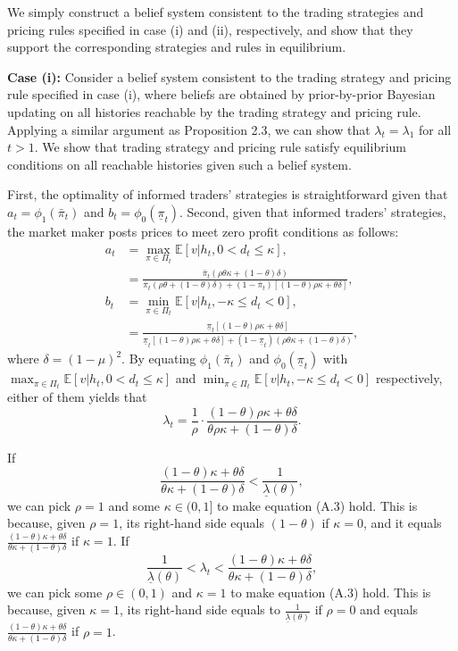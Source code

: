 \documentclass[12pt,a4paper]{article}
\newenvironment{original}{%
  \par\vspace{4pt}\noindent%
  \color{black}%
  \ignorespaces
}{%
  \par\vspace{2pt}%
}
\begin{document}
\begin{original}
We simply construct a belief system consistent to the trading strategies and pricing rules specified in case (i) and (ii), respectively, and show that they support the corresponding strategies and rules in equilibrium.

\textbf{Case (i):} Consider a belief system consistent to the trading strategy and pricing rule specified in case (i), where beliefs are obtained by prior-by-prior Bayesian updating on all histories reachable by the trading strategy and pricing rule. Applying a similar argument as Proposition 2.3, we can show that $\lambda_t = \lambda_1$ for all $t > 1$. We show that trading strategy and pricing rule satisfy equilibrium conditions on all reachable histories given such a belief system.

First, the optimality of informed traders' strategies is straightforward given that $a_t = \phi_1(\bar{\pi}_t)$ and $b_t = \phi_0(\underline{\pi}_t)$. Second, given that informed traders' strategies, the market maker posts prices to meet zero profit conditions as follows:
\begin{align*}
a_t &= \max_{\pi\in\Pi_t} \mathbb{E}[v|h_t, 0 < d_t \leq \kappa], \\
&= \frac{\bar{\pi}_t(\rho\theta\kappa + (1-\theta)\delta)}{\bar{\pi}_t(\rho\theta + (1-\theta)\delta) + (1-\bar{\pi}_t)[(1-\theta)\rho\kappa + \theta\delta]}, \\
b_t &= \min_{\pi\in\Pi_t} \mathbb{E}[v|h_t, -\kappa \leq d_t < 0], \\
&= \frac{\underline{\pi}_t[(1-\theta)\rho\kappa + \theta\delta]}{\underline{\pi}_t[(1-\theta)\rho\kappa + \theta\delta] + (1-\underline{\pi}_t)(\rho\theta\kappa + (1-\theta)\delta)},
\end{align*}
where $\delta = (1-\mu)^2$. By equating $\phi_1(\bar{\pi}_t)$ and $\phi_0(\underline{\pi}_t)$ with $\max_{\pi\in\Pi_t} \mathbb{E}[v|h_t, 0 < d_t \leq \kappa]$ and $\min_{\pi\in\Pi_t} \mathbb{E}[v|h_t, -\kappa \leq d_t < 0]$ respectively, either of them yields that
\[
\lambda_t = \frac{1}{\rho} \cdot \frac{(1-\theta)\rho\kappa + \theta\delta}{\theta\rho\kappa + (1-\theta)\delta}. \tag{A.3}
\]

If
\[
\frac{(1-\theta)\kappa + \theta\delta}{\theta\kappa + (1-\theta)\delta} < \frac{1}{\underline{\lambda}(\theta)},
\]
we can pick $\rho = 1$ and some $\kappa \in (0, 1]$ to make equation (A.3) hold. This is because, given $\rho = 1$, its right-hand side equals $(1-\theta)$ if $\kappa = 0$, and it equals $\frac{(1-\theta)\kappa + \theta\delta}{\theta\kappa + (1-\theta)\delta}$ if $\kappa = 1$. If
\[
\frac{1}{\underline{\lambda}(\theta)} < \lambda_t < \frac{(1-\theta)\kappa + \theta\delta}{\theta\kappa + (1-\theta)\delta},
\]
we can pick some $\rho \in (0, 1)$ and $\kappa = 1$ to make equation (A.3) hold. This is because, given $\kappa = 1$, its right-hand side equals to $\frac{1}{\underline{\lambda}(\theta)}$ if $\rho = 0$ and equals $\frac{(1-\theta)\kappa + \theta\delta}{\theta\kappa + (1-\theta)\delta}$ if $\rho = 1$.


\end{original}
\end{document}

